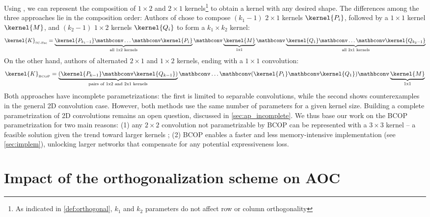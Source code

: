     
    Using \Bconv, we can represent the composition of $1 \times 2$ and $2 \times 1$ kernels\footnote{As indicated in \cref{def:orthogonal}, $k_1$ and $k_2$ parameters do not affect row or column orthogonality} to obtain a kernel with any desired shape. The differences among the three approaches lie in the composition order:  
    Authors of \cite{su_scaling-up_2021} chose to compose $(k_1-1)$ $2 \times 1$ kernels $\kernel{P_i}$, followed by a $1 \times 1$ kernel $\kernel{M}$, and $(k_2-1)$ $1 \times 2$ kernels $\kernel{Q_i}$ to form a $k_1 \times k_2$ kernel:
    \[
        \kernel{K}_{\text{\tiny{SC-Fac}}} = \underbrace{\kernel{P_{k_1-1}} \mathbconv \dots \mathbconv \kernel{P_1}}_{\text{all 1x2 kernels}} \mathbconv \underbrace{\kernel{M}}_{\text{1x1}} \mathbconv \underbrace{\kernel{Q_1} \mathbconv \dots \mathbconv \kernel{Q_{k_2-1}}}_{\text{all 2x1 kernels}}
    \]
    On the other hand, authors of \cite{li_preventing_2019}\cite{xiao_dynamical_2018} alternated $2 \times 1$ and $1 \times 2$ kernels, ending with a $1 \times 1$ convolution:
    \[
        \kernel{K}_{\text{\tiny{BCOP}}} = \underbrace{(\kernel{P_{k-1}} \mathbconv \kernel{Q_{k-1}})}_{\text{pairs of 1x2 and 2x1 kernels}} \mathbconv \dots \mathbconv (\kernel{P_1} \mathbconv \kernel{Q_1}) \mathbconv \underbrace{\kernel{M}}_{\text{1x1}}
    \]
    Both approaches have incomplete parametrizations: the first is limited to separable convolutions, while the second shows counterexamples in the general 2D convolution case. However, both methods use the same number of parameters for a given kernel size. Building a complete parametrization of 2D convolutions remains an open question, discussed in \cref{sec:ap_incomplete}. We thus base our work on the BCOP parametrization \cite{li_preventing_2019} for two main reasons: (1) any $2 \times 2$ convolution not parametrizable by BCOP can be represented with a $3 \times 3$ kernel -- a feasible solution given the trend toward larger kernels \cite{trockman_patches_2022,ding_scaling_2022}; (2) BCOP enables a faster and less memory-intensive implementation (see \cref{sec:implem}), unlocking larger networks that compensate for any potential expressiveness loss.%

\section{Impact of the orthogonalization scheme on AOC}\label{ap:tech_details}

